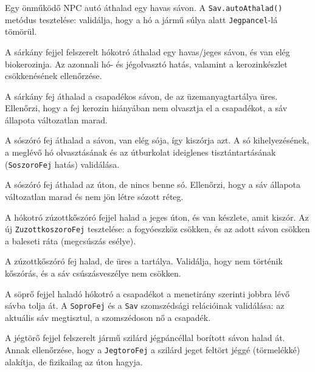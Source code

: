 {Egy önműködő NPC autó áthalad egy havas sávon.}
{A \texttt{Sav.autoAthalad()} metódus tesztelése: validálja, hogy a hó a jármű súlya alatt \texttt{Jegpancel}-lá tömörül.}


{A sárkány fejjel felszerelt hókotró áthalad egy havas/jeges sávon, és van elég biokerozinja.}
{Az azonnali hó- és jégolvasztó hatás, valamint a kerozinkészlet csökkenésének ellenőrzése.}

{A sárkány fej áthalad a csapadékos sávon, de az üzemanyagtartálya üres.}
{Ellenőrzi, hogy a fej kerozin hiányában nem olvasztja el a csapadékot, a sáv állapota változatlan marad.}

{A sószóró fej áthalad a sávon, van elég sója, így kiszórja azt.}
{A só kihelyezésének, a meglévő hó olvasztásának és az útburkolat ideiglenes tisztántartásának (\texttt{SoszoroFej} hatás) validálása.}

{A sószóró fej áthalad az úton, de nincs benne só.}
{Ellenőrzi, hogy a sáv állapota változatlan marad és nem jön létre sózott réteg.}

{A hókotró zúzottkőszóró fejjel halad a jeges úton, és van készlete, amit kiszór.}
{Az új \texttt{ZuzottkoszoroFej} tesztelése: a fogyóeszköz csökken, és az adott sávon csökken a baleseti ráta (megcsúszás esélye).}

{A zúzottkőszóró fej halad, de üres a tartálya.}
{Validálja, hogy nem történik kőszórás, és a sáv csúszásveszélye nem csökken.}

{A söprő fejjel haladó hókotró a csapadékot a menetirány szerinti jobbra lévő sávba tolja át.}
{A \texttt{SoproFej} és a \texttt{Sav} szomszédsági relációinak validálása: az aktuális sáv megtisztul, a szomszédoson nő a csapadék.}

{A jégtörő fejjel felszerelt jármű szilárd jégpáncéllal borított sávon halad át.}
{Annak ellenőrzése, hogy a \texttt{JegtoroFej} a szilárd jeget feltört jéggé (törmelékké) alakítja, de fizikailag az úton hagyja.}

